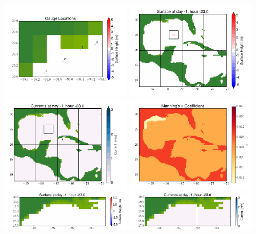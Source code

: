 \documentclass[11pt]{article}
\begin{document}
\includegraphics[width=0.475\textwidth]{frame0024fig10.png}
\vskip 10pt 
\includegraphics[width=0.475\textwidth]{frame0025fig1.png}
\includegraphics[width=0.475\textwidth]{frame0025fig2.png}
\vskip 10pt 
\includegraphics[width=0.475\textwidth]{frame0025fig3.png}
\includegraphics[width=0.475\textwidth]{frame0025fig4.png}
\vskip 10pt 
\includegraphics[width=0.475\textwidth]{frame0025fig5.png}
\end{document}
